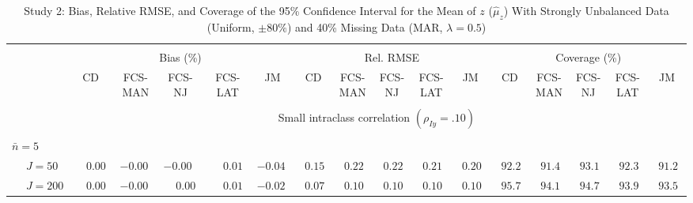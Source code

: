 \begin{sidewaystable}
\begin{threeparttable}
\setlength{\tabcolsep}{1.0pt}
\renewcommand{\arraystretch}{0.95}
\footnotesize
\caption{\small Study 2: Bias, Relative RMSE, and Coverage of the 95\% Confidence Interval for the Mean of $z$ ($\hat\mu_z$) With Strongly Unbalanced Data (Uniform, $\pm 80\%$) and 40\% Missing Data (MAR, $\lambda=0.5$)}
\begin{tabular}{llccccccccccccccc}
\hline\\[-1.8ex]
& & \multicolumn{5}{c}{Bias (\%)} & \multicolumn{5}{c}{Rel. RMSE} & \multicolumn{5}{c}{Coverage (\%)} \\ \cmidrule(r){3-7}\cmidrule(r){8-12}\cmidrule(r){13-17}
 &  & CD & \makecell{FCS-\\MAN} & \makecell{FCS-\\NJ} & \makecell{FCS-\\LAT} & JM & CD & \makecell{FCS-\\MAN} & \makecell{FCS-\\NJ} & \makecell{FCS-\\LAT} & JM & CD & \makecell{FCS-\\MAN} & \makecell{FCS-\\NJ} & \makecell{FCS-\\LAT} & \multicolumn{1}{c}{JM} \\ 
[0.4ex]\hline\\[-1.8ex]
& & \multicolumn{15}{c}{Small intraclass correlation $(\rho_{Iy}=.10)$} \\[0.6ex]\hline\\[-1.8ex]
\multicolumn{4}{l}{$\bar{n}=5$} \\  & \nopagebreak $\;J=50$  & $\phantom{-}0.00\phantom{0}$ & ${-}0.00\phantom{0}$ & ${-}0.00\phantom{0}$ & $\phantom{-}0.01\phantom{0}$ & ${-}0.04\phantom{0}$ & $\phantom{0}0.15\phantom{0}$ & $\phantom{0}0.22\phantom{0}$ & $\phantom{0}0.22\phantom{0}$ & $\phantom{0}0.21\phantom{0}$ & $\phantom{0}0.20\phantom{0}$ & $\phantom{0}92.2\phantom{0}$ & $\phantom{0}91.4\phantom{0}$ & $\phantom{0}93.1\phantom{0}$ & $\phantom{0}92.3\phantom{0}$ & $\phantom{0}91.2\phantom{0}$ \\
 & \nopagebreak $\;J=200$  & $\phantom{-}0.00\phantom{0}$ & ${-}0.00\phantom{0}$ & $\phantom{-}0.00\phantom{0}$ & $\phantom{-}0.01\phantom{0}$ & ${-}0.02\phantom{0}$ & $\phantom{0}0.07\phantom{0}$ & $\phantom{0}0.10\phantom{0}$ & $\phantom{0}0.10\phantom{0}$ & $\phantom{0}0.10\phantom{0}$ & $\phantom{0}0.10\phantom{0}$ & $\phantom{0}95.7\phantom{0}$ & $\phantom{0}94.1\phantom{0}$ & $\phantom{0}94.7\phantom{0}$ & $\phantom{0}93.9\phantom{0}$ & $\phantom{0}93.5\phantom{0}$ \\

\end{tabular}
\end{threeparttable}
\end{sidewaystable}

